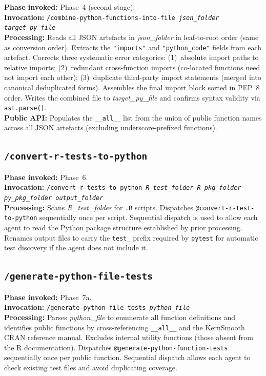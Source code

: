 \documentclass[12pt,a4paper]{article}
\makeatletter
\newcommand{\agent}[1]{\texttt{@#1}}
\makeatother
\begin{document}
\textbf{Phase invoked:} Phase~4 (second stage).\\
\textbf{Invocation:} \texttt{/combine-python-functions-into-file \textit{json\_folder} \textit{target\_py\_file}}\\
\textbf{Processing:} Reads all JSON artefacts in \textit{json\_folder} in leaf-to-root order (same as conversion order). Extracts the \texttt{"imports"} and \texttt{"python\_code"} fields from each artefact. Corrects three systematic error categories: (1)~absolute import paths to relative imports; (2)~redundant cross-function imports (co-located functions need not import each other); (3)~duplicate third-party import statements (merged into canonical deduplicated forms). Assembles the final import block sorted in PEP~8 order. Writes the combined file to \textit{target\_py\_file} and confirms syntax validity via \texttt{ast.parse()}.\\
\textbf{Public API:} Populates the \texttt{\_\_all\_\_} list from the union of public function names across all JSON artefacts (excluding underscore-prefixed functions).

\subsection{\texttt{/convert-r-tests-to-python}}
\label{supp:skill-convert-tests}

\textbf{Phase invoked:} Phase~6.\\
\textbf{Invocation:} \texttt{/convert-r-tests-to-python \textit{R\_test\_folder} \textit{R\_pkg\_folder} \textit{py\_pkg\_folder} \textit{output\_folder}}\\
\textbf{Processing:} Scans \textit{R\_test\_folder} for \texttt{.R} scripts. Dispatches \agent{convert-r-test-to-python} sequentially once per script. Sequential dispatch is used to allow each agent to read the Python package structure established by prior processing. Renames output files to carry the \texttt{test\_} prefix required by \texttt{pytest} for automatic test discovery if the agent does not include it.

\subsection{\texttt{/generate-python-file-tests}}
\label{supp:skill-gen-tests}

\textbf{Phase invoked:} Phase~7a.\\
\textbf{Invocation:} \texttt{/generate-python-file-tests \textit{python\_file}}\\
\textbf{Processing:} Parses \textit{python\_file} to enumerate all function definitions and identifies public functions by cross-referencing \texttt{\_\_all\_\_} and the KernSmooth CRAN reference manual. Excludes internal utility functions (those absent from the R documentation). Dispatches \agent{generate-python-function-tests} sequentially once per public function. Sequential dispatch allows each agent to check existing test files and avoid duplicating coverage.
\end{document}
